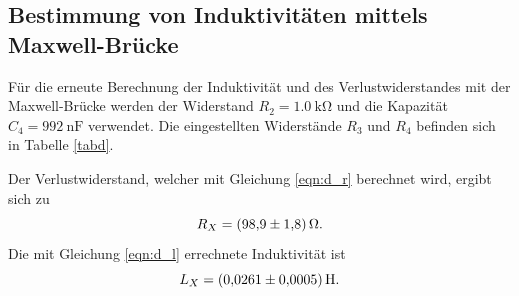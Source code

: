 \subsection{Bestimmung von Induktivitäten mittels Maxwell-Brücke}
Für die erneute Berechnung der Induktivität und des Verlustwiderstandes mit der Maxwell-Brücke werden der Widerstand
$R_2 = \SI{1.0}{\kilo\ohm}$ und die Kapazität $C_4 = \SI{992}{\nano\farad}$ verwendet.
Die eingestellten Widerstände $R_3$ und $R_4$ befinden sich in Tabelle \ref{tabd}.

\noindent Der Verlustwiderstand, welcher mit Gleichung \eqref{eqn:d_r} berechnet wird, ergibt sich zu
\begin{equation*}
    R_X = \SI{98.9 \pm 1.8}{\ohm}.
\end{equation*}
Die mit Gleichung \eqref{eqn:d_l} errechnete Induktivität ist
\begin{equation*}
    L_X = \SI{0.0261 \pm 0.0005}{\henry}.
\end{equation*}

